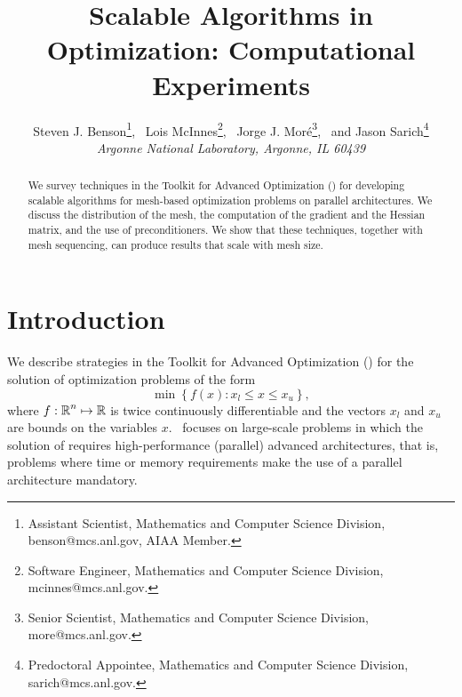 \title{Scalable Algorithms in Optimization: Computational Experiments}

\author{%
Steven J. Benson\thanks{Assistant Scientist, Mathematics and Computer Science Division, 
benson@mcs.anl.gov, AIAA Member.},
\ Lois McInnes\thanks{Software Engineer,  Mathematics and Computer Science Division, 
mcinnes@mcs.anl.gov.},
\ Jorge J. Mor\'e\thanks{Senior Scientist,  Mathematics and Computer Science Division, 
more@mcs.anl.gov.},
\ and Jason Sarich\thanks{Predoctoral Appointee,  Mathematics and Computer Science Division, 
sarich@mcs.anl.gov.} \\
{\normalsize\itshape Argonne National Laboratory, Argonne, IL 60439}
}%


\maketitle

\begin{abstract}
We survey techniques in the Toolkit for Advanced
Optimization (\tao) for developing scalable algorithms for
mesh-based optimization problems on parallel
architectures.  We discuss the distribution of the mesh, the
computation of the gradient and the Hessian matrix, and the
use of preconditioners.  We show that these techniques,
together with mesh sequencing, can produce results that
scale with mesh size.
\end{abstract}


\section{Introduction}

We describe strategies in the Toolkit for Advanced
Optimization (\tao) \cite{TAO-manual,tao-home} for the
solution of optimization problems of the form
\begin{equation}
  \label{eq:opt}
  \min \left \{ f (x) : x_l \le x \le x_u \right \} ,
\end{equation}
where $ f : \mbox{${\mathbb R}$}^n \mapsto \mbox{${\mathbb R}$} $ is twice continuously differentiable
and the vectors $ x_l $ and $ x_u $ are bounds on the
variables $x$.
\tao\ focuses on large-scale problems in which the solution of
 requires high-performance (parallel)
advanced architectures, that is, problems where
time or memory requirements make the use of a parallel
architecture mandatory.

